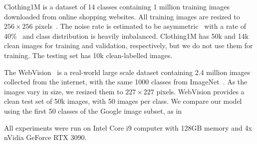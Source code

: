\documentclass[review]{elsarticle}
\theoremstyle{plain}
\begin{document}
Clothing1M is a dataset of 14 classes containing 1 million training images downloaded from online shopping websites.
All training images are resized to $256 \times 256$ pixels~\citep{li2020dividemix, han2019deep}. 
The noise rate is estimated to be asymmetric~\citep{yi2019probabilistic} with a rate of 40\%~\citep{xiao2015learning} and class distribution is heavily imbalanced.
Clothing1M has 50k and 14k clean images for 
training and validation, respectively, but we do not use them for training. 
The testing set has 10k clean-labelled images.

The WebVision~\citep{li2017webvision} is a real-world large scale dataset containing 2.4 million images collected from the  internet,  with  the  same 1000 classes from ImageNet~\citep{deng2009imagenet}. As the images vary in size, we resized them to  $227 \times 227$ pixels. WebVision provides a clean test set of 50k images, with 50 images per class.  We compare our model using the first 50 classes of the Google image subset, as in \citep{li2020dividemix, chen2019understanding}

All experiments were run on Intel Core i9 computer with 128GB memory and 4x nVidia GeForce RTX 3090.


\begin{table}
\centering
{}
\caption{Test accuracy (\%) for Red Mini-ImageNet. Results from baseline methods are as presented in \citep{FaMUS}. Top methods within $1\%$ are in \textbf{bold}.}
\label{tab:results_red_noise}
\end{table}
\end{document}
